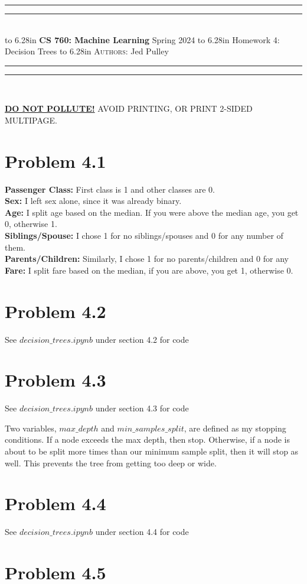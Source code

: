 \documentclass{article}
\newcommand{\lecture}[2]{
\pagestyle{myheadings}
\thispagestyle{plain}
\newpage
\noindent
\begin{center}
\rule{\textwidth}{1.6pt}\vspace*{-\baselineskip}\vspace*{2pt} %
\rule{\textwidth}{0.4pt}\\[1\baselineskip] %
\vbox{\vspace{2mm}
\hbox to 6.28in { {\bf CS 760: Machine Learning} \hfill Spring 2024 }
\vspace{4mm}
\hbox to 6.28in { {\Large \hfill #1  \hfill} }
\vspace{4mm}
\hbox to 6.28in { {\scshape Authors:}  #2 \hfill }}
\vspace{-2mm}
\rule{\textwidth}{0.4pt}\vspace*{-\baselineskip}\vspace{3.2pt} %
\rule{\textwidth}{1.6pt}\\[\baselineskip] %
\end{center}
\vspace*{4mm}
}
\begin{document}
\lecture{Homework 4: Decision Trees}{Jed Pulley}

\begin{center}
{\Large {\sf \underline{\textbf{DO NOT POLLUTE!}} AVOID PRINTING, OR PRINT 2-SIDED MULTIPAGE.}}
\end{center}

\section*{Problem 4.1}
\textbf{Passenger Class:} First class is 1 and other classes are 0. \\
\textbf{Sex:} I left sex alone, since it was already binary. \\
\textbf{Age:} I split age based on the median. If you were above the median age, you get 0, otherwise 1. \\
\textbf{Siblings/Spouse:} I chose 1 for no siblings/spouses and 0 for any number of them. \\
\textbf{Parents/Children:} Similarly, I chose 1 for no parents/children and 0 for any \\
\textbf{Fare:} I split fare based on the median, if you are above, you get 1, otherwise 0.

\section*{Problem 4.2}
See $decision\_trees.ipynb$ under section 4.2 for code

\section*{Problem 4.3}
See $decision\_trees.ipynb$ under section 4.3 for code

Two variables, $max\_depth$ and $min\_samples\_split$, are defined as my  stopping conditions. If a node exceeds the max depth, then stop. Otherwise, if a node is about to be split more times than our minimum sample split, then it will stop as well. This prevents the tree from getting too deep or wide.

\section*{Problem 4.4}
See $decision\_trees.ipynb$ under section 4.4 for code

\section*{Problem 4.5}
\end{document}
